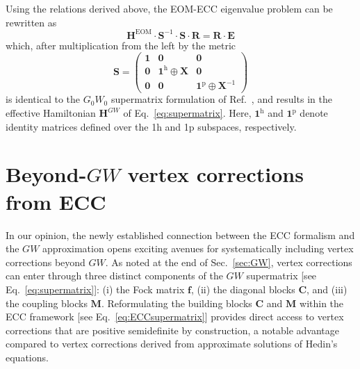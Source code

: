 \documentclass[aip,jcp,reprint,noshowkeys,superscriptaddress]{revtex4-2}
\newcommand{\EOM}{\text{EOM}}
\newcommand{\bC}{\boldsymbol{C}}
\newcommand{\bX}{\boldsymbol{X}}
\newcommand{\bR}{\boldsymbol{R}}
\newcommand{\bE}{\boldsymbol{E}}
\newcommand{\bM}{\boldsymbol{M}}
\newcommand{\bH}{\boldsymbol{H}}
\newcommand{\bO}{\boldsymbol{0}}
\newcommand{\bI}{\boldsymbol{1}}
\newcommand{\bS}{\boldsymbol{S}}
\newcommand{\bff}{\boldsymbol{f}}
\begin{document}
Using the relations derived above, the EOM-ECC eigenvalue problem can be rewritten as 
\begin{equation}
	\bH^\EOM \cdot \bS^{-1} \cdot \bS \cdot \bR = \bR \cdot \bE
\end{equation}
which, after multiplication from the left by the metric  
\begin{equation}
	\bS = \begin{pmatrix}
		\bI & \bO & \bO
		\\
		\bO & \bI^\text{h} \oplus \bX  & \bO
		\\
		\bO & \bO &  \bI^\text{p} \oplus \bX^{-1}
	\end{pmatrix}
\end{equation}
is identical to the $G_0W_0$ supermatrix formulation of Ref.~, and results in the effective Hamiltonian $\bH^{GW}$ of Eq.~\eqref{eq:supermatrix}.
Here, $\bI^\text{h}$ and $\bI^\text{p}$ denote identity matrices defined over the 1h and 1p subspaces, respectively.

\section{Beyond-$GW$ vertex corrections from ECC}
\label{sec:Vertexcorrections}

In our opinion, the newly established connection between the ECC formalism and the $GW$ approximation opens exciting avenues for systematically including vertex corrections beyond $GW$.
As noted at the end of Sec.~\ref{sec:GW}, vertex corrections can enter through three distinct components of the $GW$ supermatrix [see Eq.~\eqref{eq:supermatrix}]:
(i) the Fock matrix $\bff$,
(ii) the diagonal blocks $\bC$, and
(iii) the coupling blocks $\bM$.
Reformulating the building blocks $\bC$ and $\bM$ within the ECC framework [see Eq.~\eqref{eq:ECCsupermatrix}] provides direct access to vertex corrections that are positive semidefinite by construction, a notable advantage compared to vertex corrections derived from approximate solutions of Hedin's equations. \cite{Shishkin_2007b,Chen_2015,Ren_2015,Maggio_2017b,Cunningham_2018,Vlcek_2019,Mejuto-Zaera_2022,Rohlfing_2023,Cunningham_2023,Bruneval_2024,Wen_2024,Bruneval_2025,Forster_2025}
\end{document}
